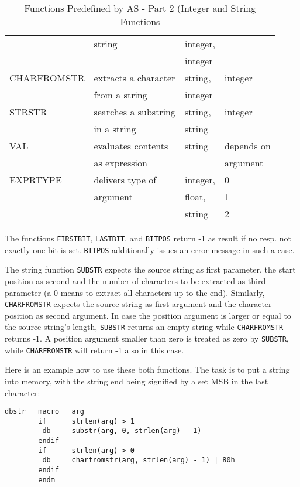 \documentclass[12pt,twoside]{report}
\newcommand{\tty}[1]{{\tt #1}}
\newcommand{\asname}{{AS}}
\begin{document}
\begin{table*}[htbp]
\begin{center}
\begin{tabular}{|l|l|l|l|}
            & string               & integer,             & \\
            &                      & integer              & \\
CHARFROMSTR & extracts a character & string,              & integer \\
            & from a string        & integer              & \\
STRSTR      & searches a substring & string,              & integer \\
            & in a string          & string               & \\
VAL         & evaluates contents   & string               & depends on \\
            & as expression        &                      & argument \\
EXPRTYPE    & delivers type of     & integer,             & 0 \\
            & argument             & float,               & 1 \\
            &                      & string               & 2 \\
\hline
\end{tabular}\end{center}
\caption{Functions Predefined by \asname{} - Part 2 (Integer and
         String Functions \label{TabFuncs2}}
\end{table*}
The functions \tty{FIRSTBIT}, \tty{LASTBIT}, and \tty{BITPOS} return -1 as
result if no resp. not exactly one bit is set.  \tty{BITPOS} additionally
issues an error message in such a case.

The string function \tty{SUBSTR} expects the source string as first
parameter, the start position as second and the number of characters to be
extracted as third parameter (a 0 means to extract all characters up to
the end).  Similarly, \tty{CHARFROMSTR} expects the source string as
first argument and the character position as second argument.  In case the
position argument is larger or equal to the source string's length,
\tty{SUBSTR} returns an empty string while \tty{CHARFROMSTR} returns -1.
A position argument smaller than zero is treated as zero by \tty{SUBSTR},
while \tty{CHARFROMSTR} will return -1 also in this case.

Here is an example how to use these both functions.  The task is to put a
string into memory, with the string end being signified by a set MSB in
the last character:

\begin{verbatim}
dbstr   macro   arg
        if      strlen(arg) > 1
         db     substr(arg, 0, strlen(arg) - 1)
        endif
        if      strlen(arg) > 0
         db     charfromstr(arg, strlen(arg) - 1) | 80h
        endif
        endm
\end{verbatim}
\end{document}
